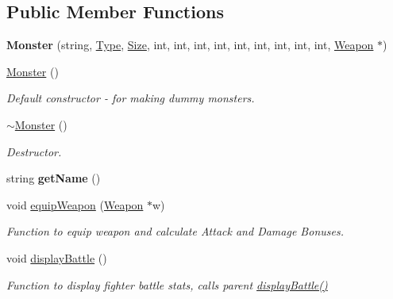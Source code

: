 \subsection*{Public Member Functions}
\begin{DoxyCompactItemize}
\item 
\hypertarget{class_monster_ac7222e2f2db276b4772d342361ca7444}{}\label{class_monster_ac7222e2f2db276b4772d342361ca7444} 
{\bfseries Monster} (string, \hyperlink{_entity_8h_a1d1cfd8ffb84e947f82999c682b666a7}{Type}, \hyperlink{_entity_8h_a1c40db1d9b56c27240e420765695f1c4}{Size}, int, int, int, int, int, int, int, int, int, \hyperlink{class_weapon}{Weapon} $\ast$)
\item 
\hypertarget{class_monster_a3dfc253fbec8331d42ac13c20bf9425f}{}\label{class_monster_a3dfc253fbec8331d42ac13c20bf9425f} 
\hyperlink{class_monster_a3dfc253fbec8331d42ac13c20bf9425f}{Monster} ()
\begin{DoxyCompactList}\small\item\em Default constructor -\/ for making dummy monsters. \end{DoxyCompactList}\item 
\hypertarget{class_monster_a21619ba1759b910cd2fd50d858aab338}{}\label{class_monster_a21619ba1759b910cd2fd50d858aab338} 
\hyperlink{class_monster_a21619ba1759b910cd2fd50d858aab338}{$\sim$\+Monster} ()
\begin{DoxyCompactList}\small\item\em Destructor. \end{DoxyCompactList}\item 
\hypertarget{class_monster_a6147ef9584d386252ec3b8d828701c85}{}\label{class_monster_a6147ef9584d386252ec3b8d828701c85} 
string {\bfseries get\+Name} ()
\item 
\hypertarget{class_monster_a89f0117018eb1fdd71d22fab070030e0}{}\label{class_monster_a89f0117018eb1fdd71d22fab070030e0} 
void \hyperlink{class_monster_a89f0117018eb1fdd71d22fab070030e0}{equip\+Weapon} (\hyperlink{class_weapon}{Weapon} $\ast$w)
\begin{DoxyCompactList}\small\item\em Function to equip weapon and calculate Attack and Damage Bonuses. \end{DoxyCompactList}\item 
\hypertarget{class_monster_a42e4c033144046eebe6cb502566423f7}{}\label{class_monster_a42e4c033144046eebe6cb502566423f7} 
void \hyperlink{class_monster_a42e4c033144046eebe6cb502566423f7}{display\+Battle} ()
\begin{DoxyCompactList}\small\item\em Function to display fighter battle stats, calls parent \hyperlink{class_monster_a42e4c033144046eebe6cb502566423f7}{display\+Battle()} \end{DoxyCompactList}\item 

\end{DoxyCompactItemize}
